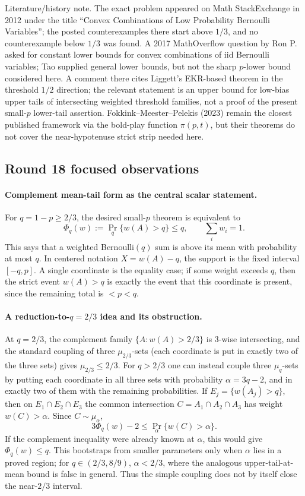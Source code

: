 \documentclass[12pt]{article}
\begin{document}
Literature/history note.  The exact problem appeared on Math StackExchange in
2012 under the title ``Convex Combinations of Low Probability Bernoulli
Variables''; the posted counterexamples there start above \(1/3\), and no
counterexample below \(1/3\) was found.  A 2017 MathOverflow question by Ron P.
asked for constant lower bounds for convex combinations of iid Bernoulli
variables; Tao supplied general lower bounds, but not the sharp \(p\)-lower
bound considered here.  A comment there cites Liggett's EKR-based theorem in
the threshold \(1/2\) direction; the relevant statement is an upper bound for
low-bias upper tails of intersecting weighted threshold families, not a proof of
the present small-\(p\) lower-tail assertion.  Fokkink--Meester--Pelekis (2023)
remain the closest published framework via the bold-play function \(\pi(p,t)\),
but their theorems do not cover the near-hypotenuse strict strip needed here.



\subsection*{Round 18 focused observations}

\paragraph{Complement mean-tail form as the central scalar statement.}
For \(q=1-p\ge2/3\), the desired small-\(p\) theorem is equivalent to
\[
   \Phi_q(w):=\Pr_q\{w(A)>q\}\le q,\qquad \sum_i w_i=1.
\]
This says that a weighted Bernoulli\((q)\) sum is above its mean with
probability at most \(q\).  In centered notation \(X=w(A)-q\), the support is
the fixed interval \([-q,p]\).  A single coordinate is the equality case; if
some weight exceeds \(q\), then the strict event \(w(A)>q\) is exactly the event
that this coordinate is present, since the remaining total is \(<p<q\).

\paragraph{A reduction-to-\(q=2/3\) idea and its obstruction.}
At \(q=2/3\), the complement family \(\{A:w(A)>2/3\}\) is 3-wise intersecting,
and the standard coupling of three \(\mu_{2/3}\)-sets (each coordinate is put
in exactly two of the three sets) gives \(\mu_{2/3}\le2/3\).  For \(q>2/3\)
one can instead couple three \(\mu_q\)-sets by putting each coordinate in all
three sets with probability \(\alpha=3q-2\), and in exactly two of them with the
remaining probabilities.  If \(E_j=\{w(A_j)>q\}\), then on
\(E_1\cap E_2\cap E_3\) the common intersection \(C=A_1\cap A_2\cap A_3\) has
weight \(w(C)>\alpha\).  Since \(C\sim\mu_\alpha\),
\[
   3\Phi_q(w)-2\le \Pr_\alpha\{w(C)>\alpha\}.
\]
If the complement inequality were already known at \(\alpha\), this would give
\(\Phi_q(w)\le q\).  This bootstraps from smaller parameters only when
\(\alpha\) lies in a proved region; for \(q\in(2/3,8/9)\), \(\alpha<2/3\), where
the analogous upper-tail-at-mean bound is false in general.  Thus the simple
coupling does not by itself close the near-\(2/3\) interval.
\end{document}
